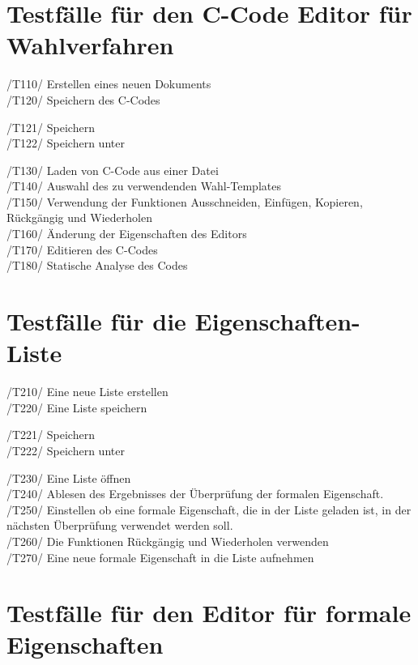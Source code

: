 \documentclass[a4paper]{scrreprt}
\begin{document}
\section{Testfälle für den C-Code Editor für Wahlverfahren}
/T110/ Erstellen eines neuen Dokuments \\
/T120/ Speichern des C-Codes 
\begin{addmargin}[25pt]{0pt} 
/T121/ Speichern \\
/T122/ Speichern unter
\end{addmargin}
/T130/ Laden von C-Code aus einer Datei \\
/T140/ Auswahl des zu verwendenden Wahl-Templates \\
/T150/ Verwendung der Funktionen Ausschneiden, Einfügen, Kopieren, Rückgängig und Wiederholen \\
/T160/ Änderung der Eigenschaften des Editors \\
/T170/ Editieren des C-Codes \\
/T180/ Statische Analyse des Codes \\

\section{Testfälle für die Eigenschaften-Liste}
/T210/ Eine neue Liste erstellen \\
/T220/ Eine Liste speichern 
\begin{addmargin}[25pt]{0pt} 
/T221/ Speichern \\
/T222/ Speichern unter
\end{addmargin}
/T230/ Eine Liste öffnen \\
/T240/ Ablesen des Ergebnisses der Überprüfung der formalen Eigenschaft. \\
/T250/ Einstellen ob eine formale Eigenschaft, die in der Liste geladen ist, in der \\ nächsten Überprüfung verwendet werden soll. \\
/T260/ Die Funktionen Rückgängig und Wiederholen verwenden \\
/T270/ Eine neue formale Eigenschaft in die Liste aufnehmen \\
\section{Testfälle für den Editor für formale Eigenschaften}
\end{document}
